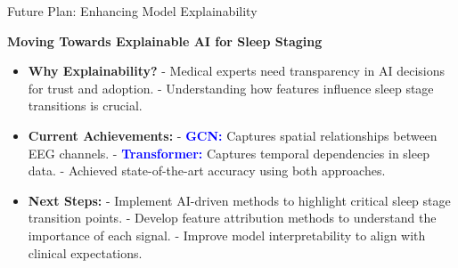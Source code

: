 
\begin{frame}{Future Plan: Enhancing Model Explainability}

    \textbf{Moving Towards Explainable AI for Sleep Staging}
    \vspace{0.5cm}
    
    \begin{itemize}
        \item \textbf{Why Explainability?}  
              - Medical experts need transparency in AI decisions for trust and adoption.  
              - Understanding how features influence sleep stage transitions is crucial.
              
        \item \textbf{Current Achievements:}  
              - \textcolor{blue}{\textbf{GCN:}} Captures spatial relationships between EEG channels.  
              - \textcolor{blue}{\textbf{Transformer:}} Captures temporal dependencies in sleep data.  
              - Achieved state-of-the-art accuracy using both approaches.
              
        \item \textbf{Next Steps:}  
              - Implement AI-driven methods to highlight critical sleep stage transition points.  
              - Develop feature attribution methods to understand the importance of each signal.  
              - Improve model interpretability to align with clinical expectations.
    \end{itemize}

\end{frame}



